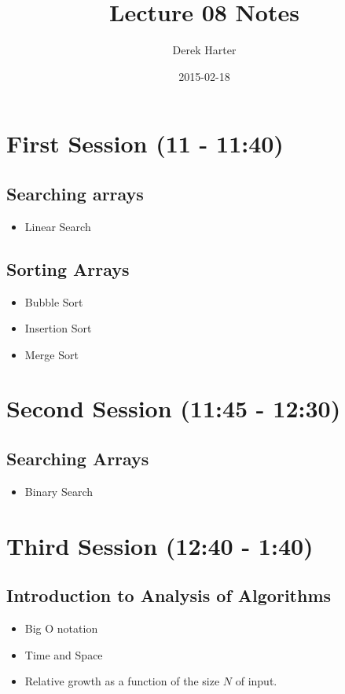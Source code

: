 \documentclass[11pt]{article}
\title{Lecture 08 Notes}
\author{Derek Harter}
\date{2015-02-18}
\begin{document}
\maketitle


\section{First Session (11 - 11:40)}
\label{sec-1}
\subsection{Searching arrays}
\label{sec-1-1}

\begin{itemize}
\item Linear Search
\end{itemize}
\subsection{Sorting Arrays}
\label{sec-1-2}

\begin{itemize}
\item Bubble Sort
\item Insertion Sort
\item Merge Sort
\end{itemize}
\section{Second Session (11:45 - 12:30)}
\label{sec-2}
\subsection{Searching Arrays}
\label{sec-2-1}

\begin{itemize}
\item Binary Search
\end{itemize}
\section{Third Session (12:40 - 1:40)}
\label{sec-3}
\subsection{Introduction to Analysis of Algorithms}
\label{sec-3-1}

\begin{itemize}
\item Big O notation
\item Time and Space
\item Relative growth as a function of the size $N$ of input.
\end{itemize}
\end{document}
